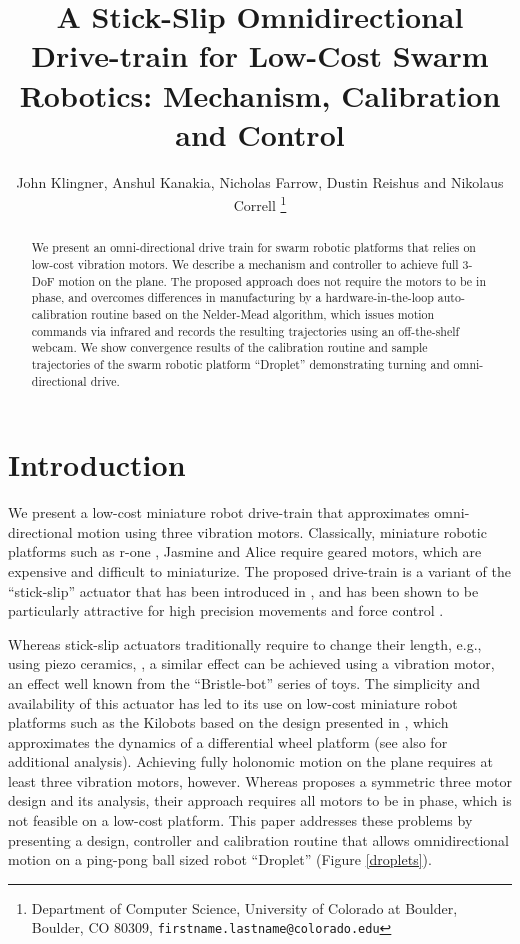 \documentclass[letterpaper, 10pt, conference]{ieeeconf}
\title{\LARGE \bf
A Stick-Slip Omnidirectional Drive-train for Low-Cost Swarm Robotics: Mechanism, Calibration and Control
}
\author{John Klingner, Anshul Kanakia, Nicholas Farrow, Dustin Reishus and Nikolaus Correll%
\thanks{Department of Computer Science,
University of Colorado at Boulder,
 Boulder, CO 80309,
{\tt\small firstname.lastname{@}colorado.edu}}%
}
\begin{document}
\maketitle


\begin{abstract}
We present an omni-directional drive train for swarm robotic platforms that relies on low-cost vibration motors. We describe a mechanism and controller to achieve full 3-DoF motion on the plane. The proposed approach does not require the motors to be in phase, and overcomes differences in manufacturing by a hardware-in-the-loop auto-calibration routine based on the Nelder-Mead algorithm, which issues motion commands via infrared and records the resulting trajectories using an off-the-shelf webcam. We show convergence results of the calibration routine and sample trajectories of the swarm robotic platform ``Droplet'' demonstrating turning and omni-directional drive.   
\end{abstract}



\section{Introduction}
We present a low-cost miniature robot drive-train that approximates omni-directional motion using three vibration motors. Classically, miniature robotic platforms such as r-one \cite{mclurkin2013low}, Jasmine \cite{jasmine} and Alice \cite{alice} require geared motors, which are expensive and difficult to miniaturize. The proposed drive-train is a variant of the ``stick-slip'' actuator that has been introduced in \cite{breguet1998stick}, and has been shown to be particularly attractive for high precision movements \cite{brufau2005micron,chu2006novel,martel2001three,martel2005fundamental,eigoli2012locomotion} and force control \cite{vartholomeos2008analysis}.   

Whereas stick-slip actuators traditionally require to change their length, e.g., using piezo ceramics,  \cite{breguet1998stick, martel2005fundamental}, a similar effect can be achieved using a vibration motor, an effect well known from the ``Bristle-bot'' series of toys. The simplicity and availability of this actuator  has led to its use on low-cost miniature robot platforms such as the Kilobots \cite{rubenstein2012kilobot} based on the design presented in \cite{Vartholomeos2006}, which approximates the dynamics of a differential wheel platform (see also \cite{spartali2013speed} for additional analysis). Achieving fully holonomic motion on the plane requires at least three vibration motors, however. Whereas \cite{Vartholomeos2005} proposes a symmetric three motor design and its analysis, their approach requires all motors to be in phase, which is not feasible on a low-cost platform. This paper addresses these problems by presenting a design, controller and calibration routine that allows omnidirectional motion on a ping-pong ball sized robot ``Droplet'' (Figure \ref{droplets}).
\end{document}
